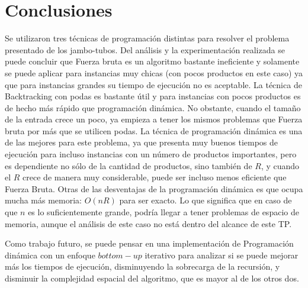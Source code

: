 \documentclass[10pt,a4paper]{article}
\begin{document}
\section{Conclusiones} \label{sec:conclusiones}
Se utilizaron tres técnicas de programación distintas para resolver el problema presentado de los jambo-tubos. Del análisis y la experimentación realizada se puede concluir que Fuerza bruta es un algoritmo bastante ineficiente y solamente se puede aplicar para instancias muy chicas (con pocos productos en este caso) ya que para instancias grandes su tiempo de ejecución no es aceptable. La técnica de Backtracking con podas es bastante útil y para instancias con pocos productos es de hecho más rápido que programación dinámica. No obstante, cuando el tamaño de la entrada crece un poco, ya empieza a tener los mismos problemas que Fuerza bruta por más que se utilicen podas. La técnica de programación dinámica es una de las mejores para este problema, ya que presenta muy buenos tiempos de ejecución para incluso instancias con un número de productos importantes, pero es dependiente no sólo de la cantidad de productos, sino también de $R$, y cuando el $R$ crece de manera muy considerable, puede ser incluso menos eficiente que Fuerza Bruta. Otras de las desventajas de la programaci\'on din\'amica es que ocupa mucha m\'as memoria: $O(nR)$ para ser exacto. Lo que significa que en caso de que $n$ es lo suficientemente grande, podr\'ia llegar a tener problemas de espacio de memoria, aunque el an\'alisis de este caso no est\'a dentro del alcance de este TP.

Como trabajo futuro, se puede pensar en una implementación de Programación dinámica con un enfoque $bottom-up$ iterativo para analizar si se puede mejorar más los tiempos de ejecución, disminuyendo la sobrecarga de la recursión, y disminuir la complejidad espacial del algoritmo, que es mayor al de los otros dos.
\end{document}
